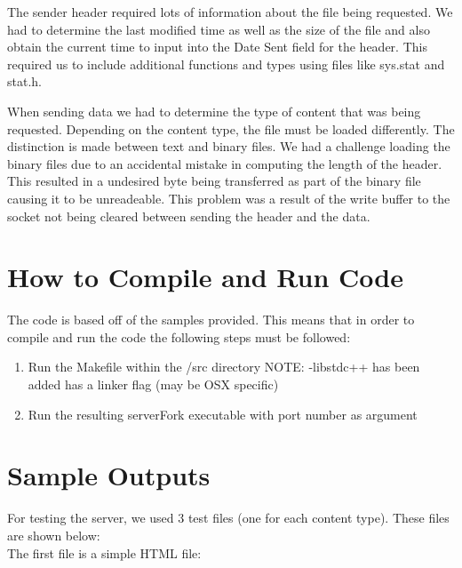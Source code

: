 \documentclass[12pt, titlepage]{article}
\begin{document}
The sender header required lots of information about the file being requested.  We had to determine the last modified time as well as the size of the file and also obtain the current time to input into the Date Sent field for the header.  This required us to include additional functions and types using files like sys.stat and stat.h.

When sending data we had to determine the type of content that was being requested. Depending on the content type, the file must be loaded differently. The distinction is made between text
and binary files. We had a challenge loading the binary files due to an accidental mistake in computing the length of the header. This resulted in a undesired byte being transferred as part of the
binary file causing it to be unreadeable. This problem was a result of the write buffer to the socket not being cleared between sending the header and the data.


\section{How to Compile and Run Code}

The code is based off of the samples provided. This means that in order to compile and run the code the following steps must be followed: \\
\begin{enumerate}
  \item Run the Makefile within the /src directory
        NOTE: -libstdc++ has been added has a linker flag (may be OSX specific)
  \item Run the resulting serverFork executable with port number as argument
\end{enumerate}

\section{Sample Outputs}

For testing the server, we used 3 test files (one for each content type). These files are shown below:\\

The first file is a simple HTML file: \\
 
\end{document}
